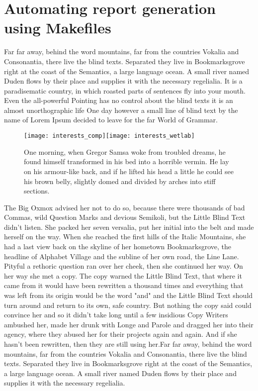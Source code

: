\documentclass[12pt,english]{article}
\begin{document}
\thispagestyle{empty}


\section*{Automating report generation using Makefiles}

Far far away, behind the word mountains, far from the countries Vokalia and 
Consonantia, there live the blind texts. Separated they live in Bookmarksgrove 
right at the coast of the Semantics, a large language ocean. A small river named 
Duden flows by their place and supplies it with the necessary regelialia. It is a 
paradisematic country, in which roasted parts of sentences fly into your mouth. 
Even the all-powerful Pointing has no control about the blind texts it is an almost 
unorthographic life One day however a small line of blind text by the name of 
Lorem Ipsum decided to leave for the far World of Grammar.

\begin{figure}[h]
\centering{}\texttt{[image: interests\_comp]}\texttt{[image: interests\_wetlab]}{\scriptsize{\caption{One morning, when Gregor Samsa woke from troubled dreams, he found himself 
transformed in his bed into a horrible vermin. He lay on his armour-like back, and 
if he lifted his head a little he could see his brown belly, slightly domed and divided 
by arches into stiff sections.}
}}
\end{figure}

The Big Oxmox advised her not to do so, because there were thousands of bad 
Commas, wild Question Marks and devious Semikoli, but the Little Blind Text didn't 
listen. She packed her seven versalia, put her initial into the belt and made herself 
on the way. When she reached the first hills of the Italic Mountains, she had a 
last view back on the skyline of her hometown Bookmarksgrove, the headline 
of Alphabet Village and the subline of her own road, the Line Lane. Pityful a 
rethoric question ran over her cheek, then she continued her way. On her
way she met a copy. The copy warned the Little Blind Text, that where it 
came from it would have been rewritten a thousand times and everything 
that was left from its origin would be the word "and" and the Little Blind Text 
should turn around and return to its own, safe country. But nothing the copy 
said could convince her and so it didn't take long until a few insidious Copy 
Writers ambushed her, made her drunk with Longe and Parole and dragged 
her into their agency, where they abused her for their projects again and again. 
And if she hasn't been rewritten, then they are still using her.Far far away, 
behind the word mountains, far from the countries Vokalia and Consonantia, 
there live the blind texts. Separated they live in Bookmarksgrove right at the 
coast of the Semantics, a large language ocean. A small river named Duden 
flows by their place and supplies it with the necessary regelialia.
\end{document}
